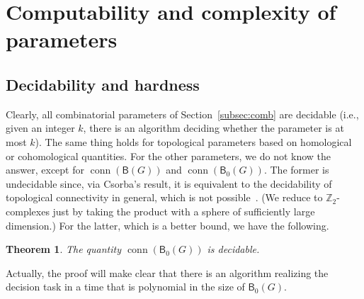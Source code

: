 \documentclass[12pt]{amsart}
\newtheorem{theorem}{Theorem}[section]
\theoremstyle{definition}
\def\Z{\mathbb{Z}}
\def\B{\mathsf{B}}
\def\conn{\operatorname{conn}}
\begin{document}

\section{Computability and complexity of parameters}\label{sec:comput}

\subsection{Decidability and hardness}\label{subsec:dec-compl}

Clearly, all combinatorial parameters of Section~\ref{subsec:comb} are decidable (i.e., given an integer $k$, there is an algorithm deciding whether the parameter is at most $k$). The same thing holds for topological parameters based on homological or cohomological quantities. For the other parameters, we do not know the answer, except for $\conn(\B(G))$ and $\conn(\B_0(G))$. \label{page:dec}The former is undecidable since, via Csorba's result, it is equivalent to the decidability of topological connectivity in general, which is not possible~\cite[Corollary 3.9]{davis1977unsolvable}. (We reduce to $\Z_2$-complexes just by taking the product with a sphere of sufficiently large dimension.) For the latter, which is a better bound, we have the following.

\begin{theorem}\label{thm:dec_B0}
The quantity $\conn(\B_0(G))$ is decidable. 
\end{theorem}

Actually, the proof will make clear that there is an algorithm realizing the decision task in a time that is polynomial in the size of $\B_0(G)$.
\end{document}
